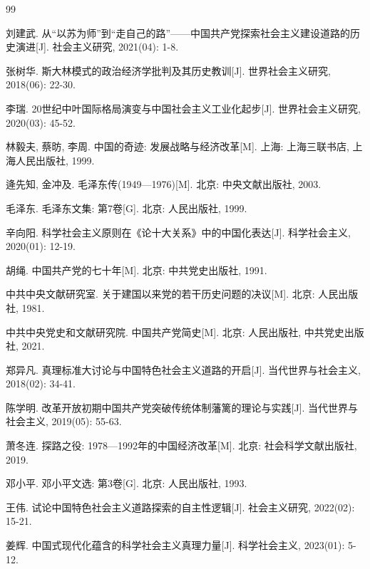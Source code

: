 \documentclass[12pt, a4paper]{ctexart}
\numberwithin{table}{section}
\numberwithin{figure}{section}
\begin{document}
\begingroup
\newpage
\renewcommand{\refname}{参考文献} 
\linespread{1.2}\selectfont 
\begin{thebibliography}{99}
\setlength{\itemsep}{0.3em} 
\setlength{\parsep}{0pt}    

刘建武. 从“以苏为师”到“走自己的路”——中国共产党探索社会主义建设道路的历史演进[J]. 社会主义研究, 2021(04): 1-8.

张树华. 斯大林模式的政治经济学批判及其历史教训[J]. 世界社会主义研究, 2018(06): 22-30.

李瑞. 20世纪中叶国际格局演变与中国社会主义工业化起步[J]. 世界社会主义研究, 2020(03): 45-52.

林毅夫, 蔡昉, 李周. 中国的奇迹: 发展战略与经济改革[M]. 上海: 上海三联书店, 上海人民出版社, 1999.

逄先知, 金冲及. 毛泽东传(1949—1976)[M]. 北京: 中央文献出版社, 2003.

毛泽东. 毛泽东文集: 第7卷[G]. 北京: 人民出版社, 1999.

辛向阳. 科学社会主义原则在《论十大关系》中的中国化表达[J]. 科学社会主义, 2020(01): 12-19.

胡绳. 中国共产党的七十年[M]. 北京: 中共党史出版社, 1991.

中共中央文献研究室. 关于建国以来党的若干历史问题的决议[M]. 北京: 人民出版社, 1981.

中共中央党史和文献研究院. 中国共产党简史[M]. 北京: 人民出版社, 中共党史出版社, 2021.

郑异凡. 真理标准大讨论与中国特色社会主义道路的开启[J]. 当代世界与社会主义, 2018(02): 34-41.

陈学明. 改革开放初期中国共产党突破传统体制藩篱的理论与实践[J]. 当代世界与社会主义, 2019(05): 55-63.

萧冬连. 探路之役: 1978—1992年的中国经济改革[M]. 北京: 社会科学文献出版社, 2019.

邓小平. 邓小平文选: 第3卷[G]. 北京: 人民出版社, 1993.

王伟. 试论中国特色社会主义道路探索的自主性逻辑[J]. 社会主义研究, 2022(02): 15-21.

姜辉. 中国式现代化蕴含的科学社会主义真理力量[J]. 科学社会主义, 2023(01): 5-12.

\end{thebibliography}
\endgroup
\end{document}
